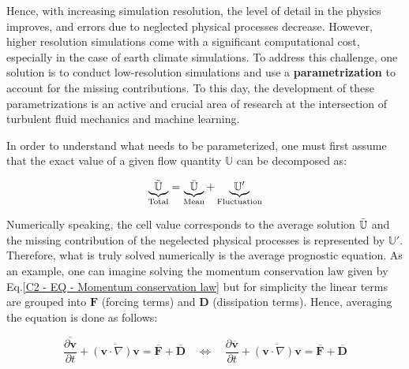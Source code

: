 \vspace{-0.5em}
Hence, with increasing simulation resolution, the level of detail in the physics improves, and errors due to neglected physical processes decrease. However, higher resolution simulations come with a significant computational cost, especially in the case of earth climate simulations. To address this challenge, one solution is to conduct low-resolution simulations and use a \textbf{parametrization} to account for the missing contributions. To this day, the development of these parametrizations is an active and crucial area of research at the intersection of turbulent fluid mechanics and machine learning.

\newpage

In order to understand what needs to be parameterized, one must first assume that the exact value of a given flow quantity $\mathbb{U}$ can be decomposed as:

\vspace{-0.4em}
\begin{equation*}
\underbrace{\Tilde{\mathbb{U}}}_{\text{Total}} = \underbrace{\Bar{\mathbb{U}}}_{\text{Mean}} + \underbrace{\mathbb{U}'}_{\text{Fluctuation}}
\label{C2 - EQ - Mean and fluctuation decomposition}
\end{equation*}

Numerically speaking, the cell value corresponds to the average solution $\Bar{\mathbb{U}}$ and the missing contribution of the negelected physical processes is represented by $\mathbb{U}'$. Therefore, what is truly solved numerically is the average prognostic equation. As an example, one can imagine solving the momentum conservation law given by Eq.\ref{C2 - EQ - Momentum conservation law} but for simplicity the linear terms are grouped into $\mathbf{F}$ (forcing terms) and $\mathbf{D}$ (dissipation terms). Hence, averaging the equation is done as follows:

\vspace{-0.2em}
\begin{equation*}
\overline{\frac{\partial \mathbf{v}}{\partial t}}+\overline{(\mathbf{v} \cdot \nabla) \mathbf{v}}=\overline{\mathbf{F}}+\overline{\mathbf{D}} \hspace{1em} \Longleftrightarrow \hspace{1em} \frac{\partial \overline{\mathbf{v}}}{\partial t}+\overline{(\mathbf{v} \cdot \nabla) \mathbf{v}}=\overline{\mathbf{F}}+\overline{\mathbf{D}}
\end{equation*}
\vspace{-0.5em}

